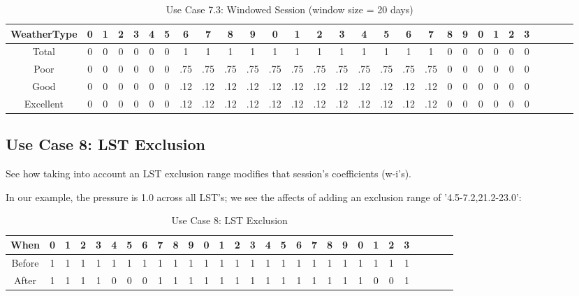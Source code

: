 \documentclass{article}
\begin{document}
\begin{table}
{\tiny
\caption{Use Case 7.3: Windowed Session (window size = 20 days)\label{tab:time}}
\begin{tabular*}{1.05\textwidth}{@{\extracolsep{\fill}}ccccccccccccccccccccccccccccc}
\hline \hline
{\bf WeatherType} & {\bf 0} & {\bf 1} & {\bf 2} & {\bf 3} & {\bf 4} & {\bf 5} & {\bf 6} & {\bf 7} & {\bf 8} & {\bf 9} & {\bf 0} & {\bf 1} & {\bf 2} & {\bf 3} & {\bf 4} & {\bf 5} & {\bf 6} & {\bf 7} & {\bf 8} & {\bf 9} & {\bf 0} & {\bf 1} & {\bf 2} & {\bf 3}\\
\hline
Total & 0 & 0 & 0 & 0 & 0 & 0 & 1 & 1 & 1 & 1 & 1 & 1 & 1 & 1 & 1 & 1 & 1 & 1 & 0 & 0 & 0 & 0 & 0 & 0\\
Poor & 0 & 0 & 0 & 0 & 0 & 0 & .75 & .75 & .75 & .75 & .75 & .75 & .75 & .75 & .75 & .75 & .75 & .75 & 0 & 0 & 0 & 0 & 0 & 0\\
Good & 0 & 0 & 0 & 0 & 0 & 0 & .12 & .12 & .12 & .12 & .12 & .12 & .12 & .12 & .12 & .12 & .12 & .12 & 0 & 0 & 0 & 0 & 0 & 0\\
Excellent & 0 & 0 & 0 & 0 & 0 & 0 & .12 & .12 & .12 & .12 & .12 & .12 & .12 & .12 & .12 & .12 & .12 & .12 & 0 & 0 & 0 & 0 & 0 & 0\\
\hline
\hline \hline
\end{tabular*}
}
\end{table}


\subsection{Use Case 8: LST Exclusion}

See how taking into account an LST exclusion range modifies that session's coefficients (w-i's).

In our example, the pressure is 1.0 across all LST's; we see the affects of adding an exclusion range of '4.5-7.2,21.2-23.0': 

\begin{table}
{\tiny
\caption{Use Case 8: LST Exclusion\label{tab:time}}
\begin{tabular*}{1.05\textwidth}{@{\extracolsep{\fill}}ccccccccccccccccccccccccccccc}
\hline \hline
{\bf When} & {\bf 0} & {\bf 1} & {\bf 2} & {\bf 3} & {\bf 4} & {\bf 5} & {\bf 6} & {\bf 7} & {\bf 8} & {\bf 9} & {\bf 0} & {\bf 1} & {\bf 2} & {\bf 3} & {\bf 4} & {\bf 5} & {\bf 6} & {\bf 7} & {\bf 8} & {\bf 9} & {\bf 0} & {\bf 1} & {\bf 2} & {\bf 3}\\
\hline
Before & 1 & 1 & 1 & 1 & 1 & 1 & 1 & 1 & 1 & 1 & 1 & 1 & 1 & 1 & 1 & 1 & 1 & 1 & 1 & 1 & 1 & 1 & 1 & 1\\
After & 1 & 1 & 1 & 1 & 0 & 0 & 0 & 1 & 1 & 1 & 1 & 1 & 1 & 1 & 1 & 1 & 1 & 1 & 1 & 1 & 1 & 0 & 0 & 1 &\\
\hline
\hline \hline
\end{tabular*}
}
\end{table}
\end{document}
